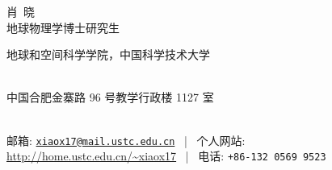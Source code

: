 \documentclass[11pt, a4paper]{article}
\makeatletter
\newcommand{\FirstName}{肖}
\newcommand{\LastName}{晓}
\newcommand{\MyName}{\FirstName\ \LastName}
\newcommand{\MyRole}{地球物理学博士研究生}
\newcommand{\Email}{xiaox17@mail.ustc.edu.cn}
\newcommand{\Website}{http://home.ustc.edu.cn/~xiaox17}
\newcommand{\Phone}{+86-132\,0569\,9523}
\newcommand{\Affiliation}{
    地球和空间科学学院，中国科学技术大学
}
\newcommand{\Address}{
    中国合肥金寨路 96 号教学行政楼 1127 室
}
\newcommand{\makefield}[2]{\makebox[1.5em]{\color{MarkerColour!80!black}#1} #2}
\makeatother
\begin{document}
\thispagestyle{empty}

\begin{center}
    {\fontsize{36pt}{0}\selectfont \MyName}
    \\[0.5cm]
    {\fontsize{16pt}{0}\selectfont \MyRole}
    \\[0.3cm]
    {\fontsize{10pt}{0}\selectfont
        \Affiliation
        \\[0.2cm]
        \Address
        \\[0.08cm]
        邮箱: \href{mailto:\Email}{\texttt{\Email}}
        \, | \,
        个人网站: \url{\Website}
        \, | \,
        电话: \texttt{\Phone}
    }
\end{center}








%

%
\end{document}
